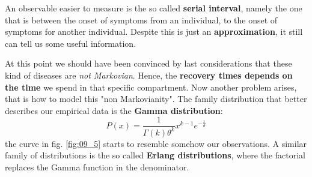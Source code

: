 \documentclass[../main/main.tex]{subfiles}
\begin{document}
\begin{figure}[h!]
    \centering
    \qquad
    \caption{\label{fig:09_4}}
\end{figure}

An observable easier to measure is the so called \textbf{serial interval}, namely the one that is between the onset of symptoms from an individual, to the onset of symptoms for another individual. Despite this is just an \textbf{approximation}, it still can tell us some useful information.

At this point we should have been convinced by last considerations that these kind of diseases are \textit{not Markovian}. Hence, the \textbf{recovery times depends on the time} we spend in that specific compartment. Now another problem arises, that is how to model this "non Markovianity".
The family distribution that better describes our empirical data is the \textbf{Gamma distribution}:
\begin{equation*}
  P(x) = \frac{1}{\Gamma (k) \theta ^k} x^{k-1} e^{- \frac{x}{\theta }}
\end{equation*}
the curve in fig. \ref{fig:09_5} starts to resemble somehow our observations. A similar family of distributions is the so called \textbf{Erlang distributions}, where the factorial replaces the Gamma function in the denominator.
\end{document}
